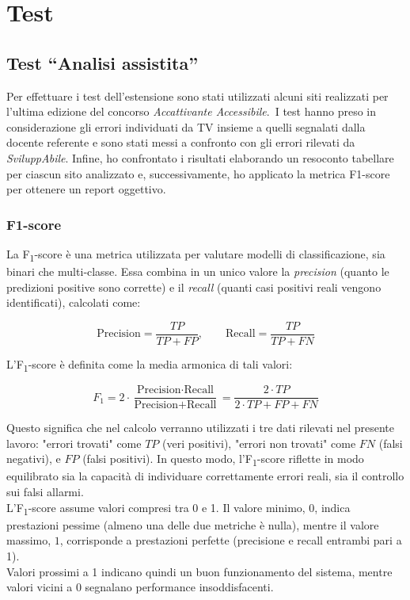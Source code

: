 \chapter{Test}
\label{chap:test}

\section{Test ``Analisi assistita''}
\noindent Per effettuare i test dell’estensione sono stati utilizzati alcuni siti realizzati per l’ultima edizione del concorso \textit{Accattivante Accessibile}.\
I test hanno preso in considerazione gli errori individuati da TV insieme a quelli segnalati dalla docente referente e sono stati messi a confronto con gli errori rilevati da \textit{SviluppAbile}.
Infine, ho confrontato i risultati elaborando un resoconto tabellare per ciascun sito analizzato e, successivamente, ho applicato la metrica F1-score per ottenere un report oggettivo.

\subsection{F1-score}
\noindent La F\textsubscript{1}-score è una metrica utilizzata per valutare modelli di classificazione, sia binari che multi‐classe. Essa combina in un unico valore la \textit{precision} (quanto le predizioni positive sono corrette) e il \textit{recall} (quanti casi positivi reali vengono identificati), calcolati come:

\[
\text{Precision} = \frac{TP}{TP + FP}, 
\qquad
\text{Recall} = \frac{TP}{TP + FN}
\]

\vspace{0.5cm}
\noindent L’F\textsubscript{1}-score è definita come la media armonica di tali valori:

\[
F_{1} = 2 \cdot \frac{\text{Precision} \cdot \text{Recall}}{\text{Precision} + \text{Recall}}
 = \frac{2 \cdot TP}{2 \cdot TP + FP + FN}
\]
\vspace{0.1cm}

\noindent Questo significa che nel calcolo verranno utilizzati i tre dati rilevati nel presente lavoro:
"errori trovati" come \(TP\) (veri positivi), "errori non trovati" come \(FN\) (falsi negativi), e \(FP\) (falsi positivi).
In questo modo, l’F\textsubscript{1}-score riflette in modo equilibrato sia la capacità di individuare correttamente errori reali, sia il controllo sui falsi allarmi.\\

\noindent L’F\textsubscript{1}-score assume valori compresi tra 0 e 1. Il valore minimo, \(0\), indica prestazioni pessime (almeno una delle due metriche è nulla), mentre il valore massimo, \(1\), corrisponde a prestazioni perfette (precisione e recall entrambi pari a 1).\\
Valori prossimi a 1 indicano quindi un buon funzionamento del sistema, mentre valori vicini a 0 segnalano performance insoddisfacenti.


